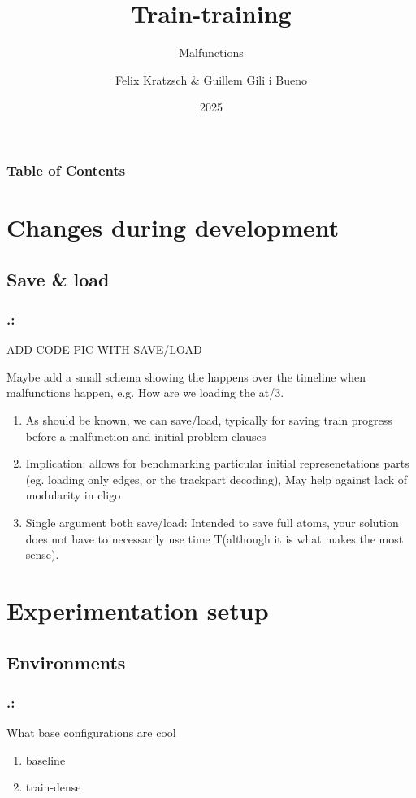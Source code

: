 \documentclass{beamer}
\title{Train-training}
\subtitle{Malfunctions}
\author{Felix  Kratzsch \& Guillem Gili i Bueno  }
\institute{Potsdam University - Railway Scheudling }
\date{2025}
\begin{document}
\frame{\titlepage}

\begin{frame}[label=toc]
\frametitle{Table of Contents}
\tableofcontents
\end{frame} 


\section{Changes during development}
\subsection{Save \& load}
\begin{frame}
	\frametitle{\thesection.\thesubsection   \secname : \subsecname}
	
	ADD CODE PIC WITH SAVE/LOAD
	
	Maybe add a small schema  showing the happens over the timeline when malfunctions happen, e.g. How are we loading the at/3.
	\begin{enumerate}
	\item{As should be known, we can save/load, typically for saving train progress before a malfunction and initial problem clauses} 
	\item{Implication: allows for benchmarking particular initial represenetations parts (eg. loading only edges, or the trackpart decoding), May help against lack of modularity in cligo}
	\item{Single argument both save/load: Intended to save full atoms, your solution does not have to necessarily use time T(although it is what makes the most sense). }
	
	 
\end{enumerate}
\end{frame}


\section{Experimentation setup}

\subsection{Environments}
\begin{frame}
	\frametitle{\thesection.\thesubsection   \secname : \subsecname}
	What base configurations are cool
	\begin{enumerate}
		\item{baseline} 
		\item{train-dense} 
	\end{enumerate}
	
\end{frame}
\end{document}
